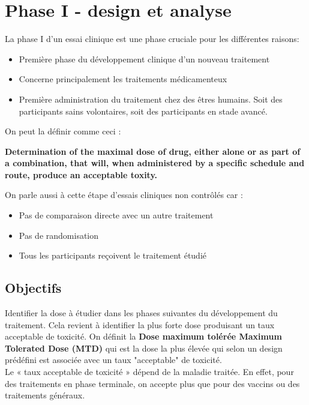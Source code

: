 \chapter{Phase I - design et analyse}

La phase I d'un essai clinique est une phase cruciale pour les différentes raisons:

\begin{itemize}
    \item Première phase du développement clinique d’un nouveau traitement
    \item Concerne principalement les traitements médicamenteux
    \item Première administration du traitement chez des êtres humains. Soit des participants sains volontaires, soit des participants en stade avancé.
\end{itemize}

\vspace{0.25cm}
On peut la définir comme ceci :
\begin{center}
    \textbf{Determination of the maximal dose of drug, either alone or as part of a combination, that will, when administered by a specific schedule and route, produce an acceptable toxity.}
\end{center}
\vspace{0.25cm}

On parle aussi à cette étape d'essais cliniques non contrôlés car :
\begin{itemize}
    \item Pas de comparaison directe avec un autre traitement
     \item Pas de randomisation
      \item Tous les participants reçoivent le traitement étudié
\end{itemize}


\section{Objectifs}
Identifier la dose à étudier dans les phases suivantes du développement du traitement. Cela revient à identifier la plus forte dose produisant un taux acceptable de toxicité. On définit la \textbf{Dose maximum tolérée Maximum Tolerated Dose (MTD)} qui est la dose la plus élevée qui selon un design prédéfini est associée avec un taux "acceptable" de toxicité.\\

Le « taux acceptable de toxicité » dépend de la maladie traitée. En effet, pour des traitements en phase terminale, on accepte plus que pour des vaccins ou des traitements généraux.\\

